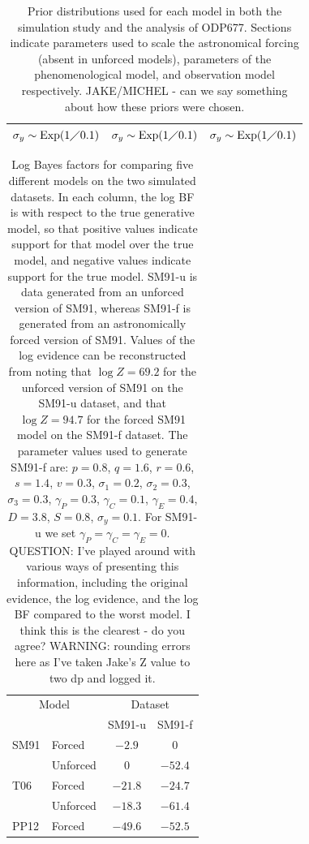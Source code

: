 \documentclass[a4paper,12pt]{article}
\begin{document}
\begin{table}
\begin{center}
\begin{tabular}{lll}
$\sigma_y\sim \operatorname{Exp}(1 \diagup 0.1)$ & $\sigma_y\sim \operatorname{Exp}(1 \diagup 0.1)$ & $\sigma_y\sim \operatorname{Exp}(1 \diagup 0.1)$ \\
\bottomrule
\end{tabular}
\label{Tab:Priors}
\caption{Prior distributions used for each model in both the simulation study and the analysis of ODP677.
Sections indicate parameters used to scale the astronomical forcing (absent in unforced models), parameters of the phenomenological model, and observation model respectively.
JAKE/MICHEL - can we say something about how these priors were chosen.
}
\end{center}
\end{table}


\clearpage


\begin{table}
\begin{center}
\begin{tabular}{ l l  c c }
\toprule
\multicolumn{2}{c}{Model} & \multicolumn{2}{c}{Dataset} \\
& & SM91-u & SM91-f\\
\midrule
SM91 & Forced & $-2.9$ & $0$\\
 & Unforced & $0$ & $-52.4$ \\
T06 & Forced & $-21.8$ & $-24.7$   \\
 & Unforced & $-18.3$ & $-61.4$ \\ 
PP12 & Forced & $-49.6$ & $-52.5$ \\
\bottomrule
\end{tabular}
\caption{Log Bayes factors for comparing five different models on the two simulated datasets. In each column, the log BF is with respect to the true generative model, so that positive values indicate support for that model over the true model, and negative values indicate support for the true model. SM91-u is data generated from an unforced version of SM91, whereas SM91-f is generated from an astronomically forced version of SM91.
Values of the log evidence can be reconstructed from noting that $\log Z=69.2$ for the unforced version of SM91 on the SM91-u dataset, and that $\log Z = 94.7$ for the forced SM91 model on the SM91-f dataset. The parameter values used to generate SM91-f are: $p=0.8$, $q=1.6$, $r=0.6$, $s=1.4$, $v=0.3$, $\sigma_1=0.2$, $\sigma_2=0.3$, $\sigma_3=0.3$, $\gamma_P=0.3$, $\gamma_C=0.1$, $\gamma_E=0.4$, $D=3.8$, $S=0.8$, $\sigma_y=0.1$.
For SM91-u we set $\gamma_P = \gamma_C = \gamma_E = 0$.
QUESTION: I've played around with various ways of presenting this information, including the original evidence, the log evidence, and the log BF compared to the worst model. I think this is the clearest - do you agree?
WARNING: rounding errors here as I've taken Jake's Z value to two dp and logged it.
}
\label{Tab:EvidenceSS}
\end{center}
\end{table}
\end{document}
